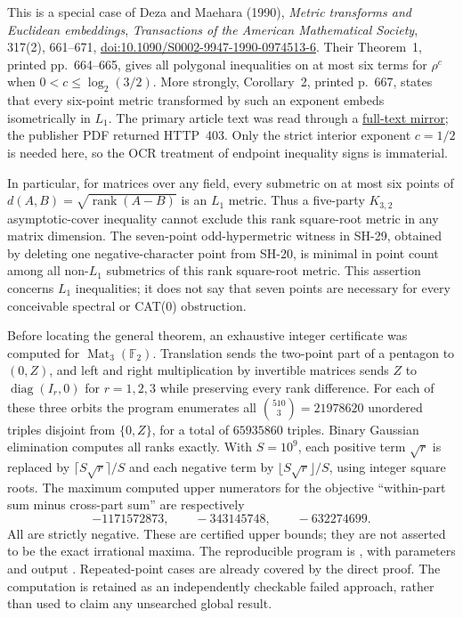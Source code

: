 This is a special case of Deza and Maehara (1990),
\emph{Metric transforms and Euclidean embeddings},
\emph{Transactions of the American Mathematical Society},
317(2), 661--671,
\href{https://doi.org/10.1090/S0002-9947-1990-0974513-6}
{doi:10.1090/S0002-9947-1990-0974513-6}.
Their Theorem~1, printed pp.~664--665, gives all polygonal
inequalities on at most six terms for $\rho^c$ when
$0<c\le\log_2(3/2)$. More strongly, Corollary~2, printed
p.~667, states that every six-point metric transformed by
such an exponent embeds isometrically in $L_1$.
The primary article text was read through a
\href{https://www.academia.edu/7373668/transactions_of_the_american_mathematical_society_METRIC_TRANSFORMS_AND_EUCLIDEAN_EMBEDDINGS}
{full-text mirror}; the publisher PDF returned HTTP~403.
Only the strict interior exponent $c=1/2$ is needed here, so
the OCR treatment of endpoint inequality signs is immaterial.

In particular, for matrices over any field, every submetric
on at most six points of
$d(A,B)=\sqrt{\operatorname{rank}(A-B)}$ is an $L_1$ metric.
Thus a five-party $K_{3,2}$ asymptotic-cover inequality cannot
exclude this rank square-root metric in any matrix dimension.
The seven-point odd-hypermetric witness in SH-29, obtained by
deleting one negative-character point from SH-20, is minimal in point
count among all non-$L_1$ submetrics of this rank square-root
metric. This assertion concerns $L_1$ inequalities; it does not
say that seven points are necessary for every conceivable
spectral or CAT(0) obstruction.

Before locating the general theorem, an exhaustive integer
certificate was computed for $\operatorname{Mat}_3(\mathbb F_2)$.
Translation sends the two-point part of a pentagon to $(0,Z)$,
and left and right multiplication by invertible matrices sends
$Z$ to $\operatorname{diag}(I_r,0)$ for $r=1,2,3$ while
preserving every rank difference. For each of these three
orbits the program enumerates all $\binom{510}{3}=21978620$
unordered triples disjoint from $\{0,Z\}$, for a total of
$65935860$ triples. Binary Gaussian elimination computes all
ranks exactly. With $S=10^9$, each positive term $\sqrt r$ is
replaced by $\lceil S\sqrt r\rceil/S$ and each negative term
by $\lfloor S\sqrt r\rfloor/S$, using integer square roots.
The maximum computed upper numerators for the objective
``within-part sum minus cross-part sum'' are respectively
\[
 -1171572873,\qquad -343145748,\qquad -632274699.
\]
All are strictly negative. These are certified upper bounds;
they are not asserted to be the exact irrational maxima.
The reproducible program is
, with parameters
 and output
.
Repeated-point cases are already covered by the direct proof.
The computation is retained as an independently checkable failed
approach, rather than used to claim any unsearched global result.
